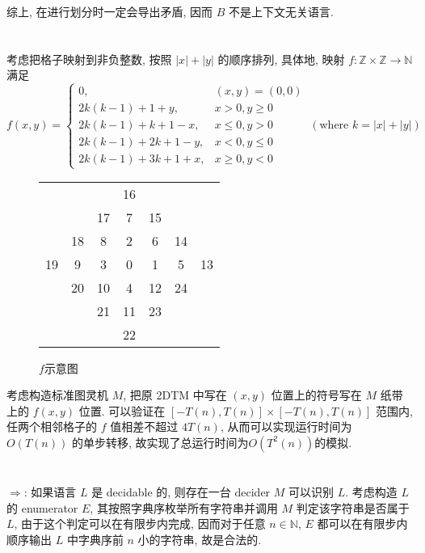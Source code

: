 \documentclass[8pt]{article}
\theoremstyle{compact}
\def\le{\leqslant}
\def\ge{\geqslant}
\begin{document}
综上, 在进行划分时一定会导出矛盾, 因而 $B$ 不是上下文无关语言.

\section{}


考虑把格子映射到非负整数, 按照 $|x| + |y|$ 的顺序排列, 具体地, 映射 $f: \mathbb Z \times \mathbb Z \to \mathbb N$ 满足
$$f(x, y) = \begin{cases}
	0, & (x, y) = (0, 0)\\
	2k(k-1) + 1 + y, & x > 0, y \ge 0\\
	2k(k-1) + k + 1 - x, & x \le 0, y > 0\\
	2k(k-1) + 2k + 1 - y, & x < 0, y \le 0\\
	2k(k-1) + 3k + 1 + x, & x \ge 0, y < 0
\end{cases} \ (\text{where } k = |x| + |y|)$$

\begin{figure}[h]
	\begin{center}
	\begin{tabular}{ccccccc}
		& & & 16 & & & \\
		& & 17 & 7 & 15 & & \\
		&18&8&2&6&14&\\
		19&9&3&0&1&5&13\\
		&20&10&4&12&24\\
		&&21&11&23&&\\
		&&&22&&&
	\end{tabular}	
	\end{center}
	\caption{$f$示意图}
\end{figure}

考虑构造标准图灵机 $M$, 把原 2DTM 中写在 $(x, y)$ 位置上的符号写在 $M$ 纸带上的 $f(x, y)$ 位置. 可以验证在 $[-T(n), T(n)] \times [-T(n), T(n)]$ 范围内, 任两个相邻格子的 $f$ 值相差不超过 $4T(n)$, 从而可以实现运行时间为 $O(T(n))$ 的单步转移, 故实现了总运行时间为$O(T^2(n))$的模拟.

\section{}

$\Rightarrow$: 如果语言 $L$ 是 decidable 的, 则存在一台 decider $M$ 可以识别 $L$. 考虑构造 $L$ 的 enumerator $E$, 其按照字典序枚举所有字符串并调用 $M$ 判定该字符串是否属于 $L$, 由于这个判定可以在有限步内完成, 因而对于任意 $n \in \mathbb N$, $E$ 都可以在有限步内顺序输出 $L$ 中字典序前 $n$ 小的字符串, 故是合法的.
\end{document}
